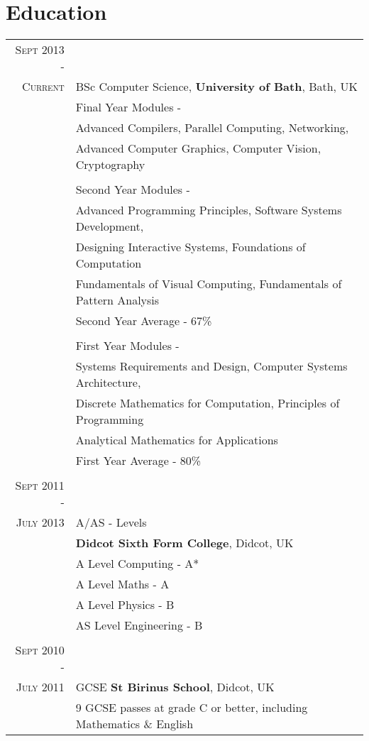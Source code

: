\documentclass[a4paper,12pt]{article}
\begin{document}
\section{Education}
\begin{tabular}{rl}
 \textsc{Sept} 2013 -\\ \textsc{Current} & BSc Computer Science, \textbf{University of Bath}, Bath, UK\\
& Final Year Modules -\\
& \hspace{0.25cm} Advanced Compilers, Parallel Computing, Networking, \\ & \hspace{0.25cm} Advanced Computer Graphics, Computer Vision, Cryptography\\
& \\
& Second Year Modules -\\
& \hspace{0.25cm} Advanced Programming Principles, Software Systems Development, \\ & \hspace{0.25cm} Designing Interactive Systems, Foundations of Computation \\ & \hspace{0.25cm} Fundamentals of Visual Computing, Fundamentals of Pattern Analysis\\
& Second Year Average - 67\%\\
& \\
& First Year Modules -\\
& \hspace{0.25cm} Systems Requirements and Design, Computer Systems Architecture, \\ & \hspace{0.25cm} Discrete Mathematics for Computation, Principles of Programming\\ & \hspace{0.25cm} Analytical Mathematics for Applications\\
& First Year Average - 80\%\\
& \\
\textsc{Sept} 2011 -\\ \textsc{July} 2013 & A/AS - Levels \\& \normalsize\textbf{Didcot Sixth Form College}, Didcot, UK\\
& A Level Computing - A*\\
& A Level Maths - A\\
& A Level Physics - B\\
& AS Level Engineering - B\\&\\
\textsc{Sept} 2010 -\\ \textsc{July} 2011& GCSE \textbf{St Birinus School}, Didcot, UK\\
&9 GCSE passes at grade C or better, including Mathematics \& English \\
\end{tabular}
\end{document}
